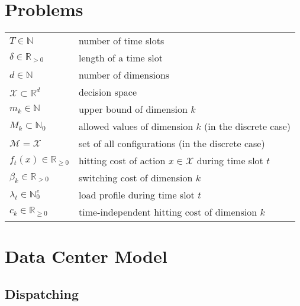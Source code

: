 \label{chapter:notation}

\section*{Problems}

\begin{tabularx}{\textwidth}{p{100pt}X}
    $T \in \mathbb{N}$ & number of time slots \\
    $\delta \in \mathbb{R}_{>0}$ & length of a time slot \\
    $d \in \mathbb{N}$ & number of dimensions \\
    $\mathcal{X} \subset \mathbb{R}^d$ & decision space \\
    $m_k \in \mathbb{N}$ & upper bound of dimension $k$ \\
    $M_k \subset \mathbb{N}_0$ & allowed values of dimension $k$ (in the discrete case) \\
    $\mathcal{M} = \mathcal{X}$ & set of all configurations (in the discrete case) \\
    $f_t(x) \in \mathbb{R}_{\geq 0}$ & hitting cost of action $x \in \mathcal{X}$ during time slot $t$ \\
    $\beta_k \in \mathbb{R}_{>0}$ & switching cost of dimension $k$ \\
    $\lambda_t \in \mathbb{N}_0^e$ & load profile during time slot $t$ \\
    $c_k \in \mathbb{R}_{\geq 0}$ & time-independent hitting cost of dimension $k$ \\
\end{tabularx}

\section*{Data Center Model}

\subsection*{Dispatching}

